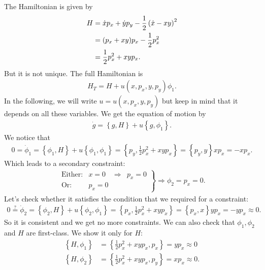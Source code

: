 The Hamiltonian is given by
\begin{align}
H &= \dot{x} p_x + \dot{y} p_y - \frac{1}{2} \left(\dot{x} - xy \right)^2 \notag \\
&= (p_x + xy)p_x - \frac{1}{2} p_x^2 \notag \\
&= \frac{1}{2} p_x^2 + xy p_x.
\end{align}
But it is not unique. The full Hamiltonian is
\begin{align}
H_T = H + u(x,p_x,y,p_y) \phi_1.
\end{align}
In the following, we will write $u = u(x,p_x,y,p_y)$ but keep in mind that it depends on all these variables. We get the equation of motion by
\begin{align}
\dot{g} = \left \{ g,H \right \} + u \left \{ g,\phi_1 \right \}.
\end{align}
We notice that
\begin{align}
0 = \dot{\phi}_1 = \left \{ \phi_1,H \right \} + u \left \{ \phi_1,\phi_1 \right \} = \left \{ p_y,\frac{1}{2} p_x^2 + xy p_x \right \} = \left \{ p_y,y \right \} x p_x = - x p_x.
\end{align}
Which leads to a secondary constraint:
\begin{align}
\left.
\begin{array}{llll}
      \text{Either:} & x = 0 & \Rightarrow &  p_x = 0 \\
      \text{Or:} & p_x = 0
\end{array}
\right \} \Longrightarrow \phi_2 = p_x = 0.
\end{align}
Let's check whether it satisfies the condition that we required for a constraint: 
\begin{align}
0 \overset{?}{=} \dot{\phi}_2 = \left \{ \phi_2,H \right \} + u \left \{ \phi_2,\phi_1 \right \} = \left \{ p_x,\frac{1}{2} p_x^2 + xy p_x \right \} = \left \{ p_x,x \right \} y p_x = - y p_x \approx 0.
\end{align}
So it is consistent and we get no more constraints. We can also check that $\phi_1, \phi_2$ and $H$ are first-class. We show it only for $H$:
\begin{align}
\left \{ H,\phi_1 \right \} &= \left \{ \frac{1}{2} p_x^2 + xyp_x, p_x \right \} = y p_x \approx 0 \\
\left \{ H,\phi_2 \right \} &= \left \{ \frac{1}{2} p_x^2 + xyp_x, p_y \right \} = x p_x \approx 0.
\end{align}



